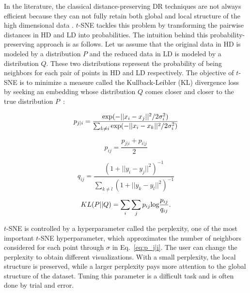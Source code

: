 In the literature, the classical distance-preserving DR techniques are not always efficient because they can not fully retain both global and local structure of the high dimensional data \cite{maaten2008tsne, van2009comparativeReview}. $t$-SNE tackles this problem by transforming the pairwise distances in HD and LD into probabilities. The intuition behind this probability-preserving approach is as follows.
Let us assume that the original data in HD is modeled by a distribution $P$ and the reduced data in LD is modeled by a distribution $Q$.
These two distributions represent the probability of being neighbors for each pair of points in HD and LD respectively.
The objective of $t$-SNE is to minimize a measure called the Kullback-Leibler (KL) divergence loss by seeking an embedding whose distribution $Q$ comes closer and closer to the true distribution $P$~\cite{maaten2008tsne}:

\begin{equation}\label{eq:p_j|i}
    p_{j|i} = \frac{\textnormal{exp}(-||x_i - x_j||^2/2\sigma_i^2)}{\sum_{k\not=i}\textnormal{exp}(-||x_i - x_k||^2/2\sigma_i^2)}
\end{equation}

\begin{equation*}
    p_{ij} = \frac{p_{j|i}+p_{i|j}}{2}
\end{equation*}

\begin{equation*}\label{eq:q_ij}
    q_{ij} = \frac{(1+||y_i - y_j||^2)^{-1}}{\sum_{k\not=l}(1+||y_k - y_l||^2)^{-1}}
\end{equation*}

\begin{equation*}\label{eq:KL}
    KL(P||Q) = \sum_{i}\sum_{j} p_{ij} \textnormal{log}\frac{p_{ij}}{q_{ij}}.
\end{equation*}

$t$-SNE is controlled by a hyperparameter called the perplexity, one of the most important  $t$-SNE hyperparameter, which approximates the number of neighbors considered for each point through $\sigma$ in Eq.~\ref{eq:p_j|i}. The user can change the perplexity to obtain different visualizations. With a small perplexity, the local structure is preserved, while a larger perplexity pays more attention to the global structure of the dataset. Tuning this parameter is a difficult task and is often done by trial and error.

